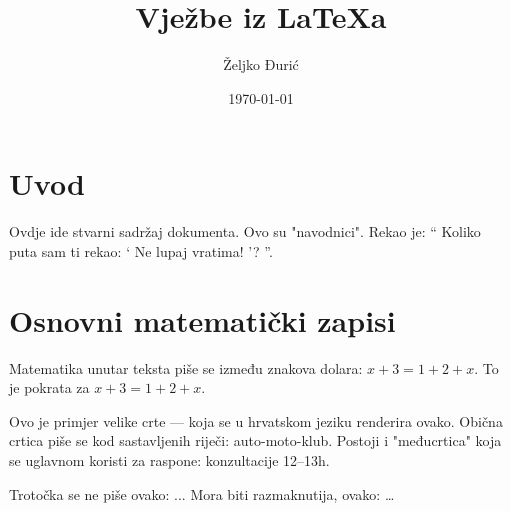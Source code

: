 \documentclass[12pt]{scrartcl}
\begin{document}
    \title{Vježbe iz \LaTeX a}
    \author{Željko Đurić}
    \date{\today}
    \maketitle
    \section{Uvod}
        Ovdje ide stvarni sadržaj dokumenta.
        Ovo su "navodnici".
        Rekao je:
        \enquote {
            Koliko puta sam ti rekao:
                \enquote {
                    Ne lupaj vratima!
                }?
        }.
    \section{Osnovni matematički zapisi}
        Matematika unutar teksta piše se između znakova dolara: $x + 3 = 1 + 2 + x$.
        To je pokrata za \(x + 3 = 1 + 2 + x\). %

        Ovo je primjer velike crte --- koja se u hrvatskom jeziku renderira ovako.
        Obična crtica piše se kod sastavljenih riječi: auto-moto-klub.
        Postoji i "međucrtica" koja se uglavnom koristi za raspone: konzultacije 12--13h.

        Trotočka se ne piše ovako: ... Mora biti razmaknutija, ovako: \ldots
\end{document}
